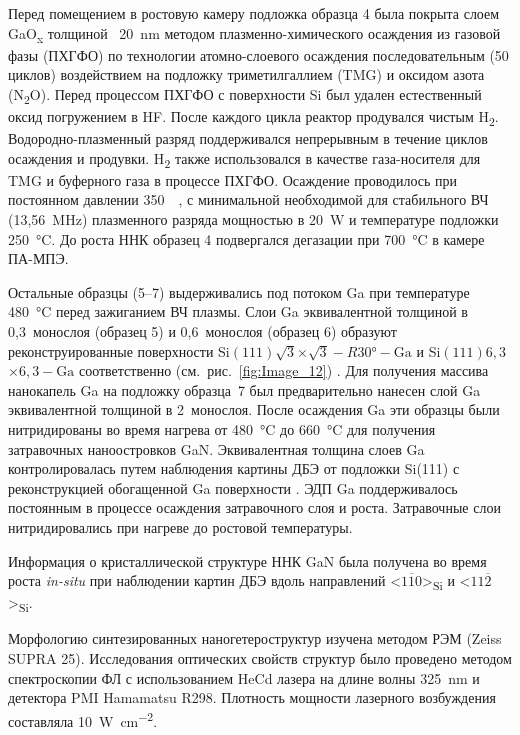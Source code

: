 Перед помещением в ростовую камеру подложка образца 4 была покрыта слоем
GaO\textsubscript{x} толщиной ~20~\si{\nano\meter} методом
плазменно-химического осаждения из газовой фазы (ПХГФО) по технологии
атомно-слоевого осаждения \cite{Altuntas2014, Ramachandran2014}
последовательным (50 циклов) воздействием на подложку триметилгаллием (TMG) и
оксидом азота (N\textsubscript{2}O). Перед процессом ПХГФО с поверхности Si был
удален естественный оксид погружением в HF. После каждого цикла реактор
продувался чистым H\textsubscript{2}. Водородно-плазменный разряд поддерживался
непрерывным в течение циклов осаждения и продувки. H\textsubscript{2} также
использовался в качестве газа-носителя для TMG и буферного газа в процессе
ПХГФО. Осаждение проводилось при постоянном давлении 350~\si{\milli\torr}, с
минимальной необходимой для стабильного ВЧ (13,56~\si{\mega\hertz}) плазменного
разряда мощностью в 20~\si{\watt} и температуре подложки
250~\si{\degreeCelsius}. До роста ННК образец 4 подвергался дегазации при
700~\si{\degreeCelsius} в камере ПА-МПЭ.

Остальные образцы (5--7) выдерживались под потоком Ga при температуре
480~\si{\degreeCelsius} перед зажиганием ВЧ плазмы. Слои Ga эквивалентной
толщиной в 0,3~монослоя (образец 5) и 0,6~монослоя (образец 6) образуют
реконструированные поверхности  Si\((111)\sqrt{3}\)\(\times\)\(\sqrt{3} -
R30\si{\degree} - \text{Ga}\) и Si\((111)6,3\)\(\times\)\(6,3 - \text{Ga}\)
соответственно (см.~рис.~\cref{fig:Image_12}) \cite{Park1988}. Для получения
массива нанокапель Ga на подложку образца~7 был предварительно нанесен слой Ga
эквивалентной толщиной в 2~монослоя. После осаждения Ga эти образцы были
нитридированы во время нагрева от 480~\si{\degreeCelsius} до
660~\si{\degreeCelsius} для получения затравочных наноостровков GaN.
Эквивалентная толщина слоев Ga контролировалась путем наблюдения картины ДБЭ от
подложки Si(111) с реконструкцией обогащенной Ga поверхности
\cite{Fedorov2018}. ЭДП Ga поддерживалось постоянным в процессе осаждения
затравочного слоя и роста. Затравочные слои нитридировались при нагреве до
ростовой температуры.

Информация о кристаллической структуре ННК GaN была получена во время роста
\textit{in-situ} при наблюдении картин ДБЭ вдоль направлений
<\(1\overline{1}0\)>\textsubscript{Si} и
<\(11\overline{2}\)>\textsubscript{Si}.

Морфологию синтезированных наногетероструктур изучена методом РЭМ (Zeiss SUPRA
25). Исследования оптических свойств структур было проведено методом
спектроскопии ФЛ с использованием HeCd лазера на длине волны
325~\si{\nano\meter} и детектора PMI Hamamatsu R298. Плотность мощности
лазерного возбуждения составляла 10~\si{\watt\per\centi\meter\squared}.

